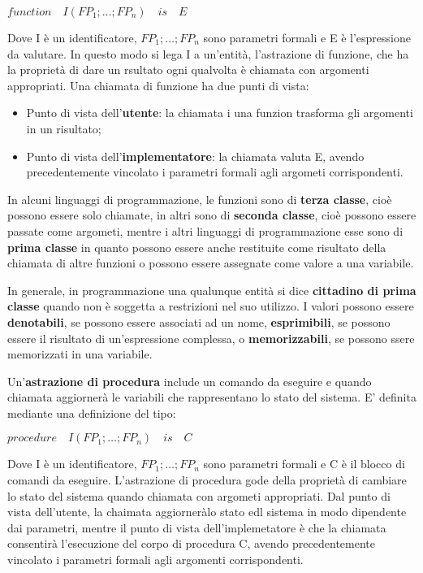\documentclass[a4paper,18pt]{extarticle}
\begin{document}
\begin{center}
    $function \quad I(FP_1;\dots;FP_n) \quad is\quad E$
\end{center}

Dove I è un identificatore, $FP_1;\dots;FP_n$ sono parametri formali e E è l'espressione da valutare. In questo modo si lega I a un'entità, l'astrazione di funzione, che ha la proprietà di dare un rsultato ogni qualvolta è chiamata con argomenti appropriati. Una chiamata di funzione ha due punti di vista:
\begin{itemize}
  \item Punto di vista dell'\textbf{utente}: la chiamata i una funzion trasforma gli argomenti in un risultato;
  \item Punto di vista dell'\textbf{implementatore}: la chiamata valuta E, avendo precedentemente vincolato i parametri formali agli argometi corrispondenti.
\end{itemize}

In alcuni linguaggi di programmazione, le funzioni sono di \textbf{terza classe}, cioè possono essere solo chiamate, in altri sono di \textbf{seconda classe}, cioè possono essere passate come argometi, mentre i altri linguaggi di programmazione esse sono di \textbf{prima classe} in quanto possono essere anche restituite come risultato della chiamata di altre funzioni o possono essere assegnate come valore a una variabile.

In generale, in programmazione una qualunque entità si dice \textbf{cittadino di prima classe} quando non è soggetta a restrizioni nel suo utilizzo. I valori possono essere \textbf{denotabili}, se possono essere associati ad un nome, \textbf{esprimibili}, se possono essere il risultato di un'espressione complessa, o \textbf{memorizzabili}, se possono ssere memorizzati in una variabile.

Un'\textbf{astrazione di procedura} include un comando da eseguire e quando chiamata aggiornerà le variabili che rappresentano lo stato del sistema. E' definita mediante una definizione del tipo:

\begin{center}
    $procedure \quad I(FP_1;\dots;FP_n) \quad is\quad C$
\end{center}

Dove I è un identificatore, $FP_1;\dots;FP_n$ sono parametri formali e C è il blocco di comandi da eseguire. L'astrazione di procedura gode della proprietà di cambiare lo stato del sistema quando chiamata con argometi appropriati. Dal punto di vista dell'utente, la chaimata aggiorneràlo stato edl sistema in modo dipendente dai parametri, mentre il punto di vista dell'implemetatore è che la chiamata consentirà l'esecuzione del corpo di procedura C, avendo precedentemente vincolato i parametri formali agli argomenti corrispondenti.
\end{document}
